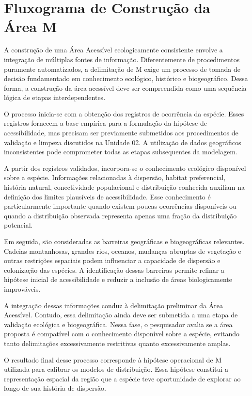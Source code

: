 \section{Fluxograma de Construção da Área M}

A construção de uma Área Acessível ecologicamente consistente envolve a integração de múltiplas fontes de informação. Diferentemente de procedimentos puramente automatizados, a delimitação de M exige um processo de tomada de decisão fundamentado em conhecimento ecológico, histórico e biogeográfico. Dessa forma, a construção da área acessível deve ser compreendida como uma sequência lógica de etapas interdependentes.

O processo inicia-se com a obtenção dos registros de ocorrência da espécie. Esses registros fornecem a base empírica para a formulação da hipótese de acessibilidade, mas precisam ser previamente submetidos aos procedimentos de validação e limpeza discutidos na Unidade 02. A utilização de dados geográficos inconsistentes pode comprometer todas as etapas subsequentes da modelagem.

A partir dos registros validados, incorpora-se o conhecimento ecológico disponível sobre a espécie. Informações relacionadas à dispersão, habitat preferencial, história natural, conectividade populacional e distribuição conhecida auxiliam na definição dos limites plausíveis de acessibilidade. Esse conhecimento é particularmente importante quando existem poucas ocorrências disponíveis ou quando a distribuição observada representa apenas uma fração da distribuição potencial.

Em seguida, são consideradas as barreiras geográficas e biogeográficas relevantes. Cadeias montanhosas, grandes rios, oceanos, mudanças abruptas de vegetação e outras restrições espaciais podem influenciar a capacidade de dispersão e colonização das espécies. A identificação dessas barreiras permite refinar a hipótese inicial de acessibilidade e reduzir a inclusão de áreas biologicamente improváveis.

A integração dessas informações conduz à delimitação preliminar da Área Acessível. Contudo, essa delimitação ainda deve ser submetida a uma etapa de validação ecológica e biogeográfica. Nessa fase, o pesquisador avalia se a área proposta é compatível com o conhecimento disponível sobre a espécie, evitando tanto delimitações excessivamente restritivas quanto excessivamente amplas.

O resultado final desse processo corresponde à hipótese operacional de M utilizada para calibrar os modelos de distribuição. Essa hipótese constitui a representação espacial da região que a espécie teve oportunidade de explorar ao longo de sua história de dispersão.

